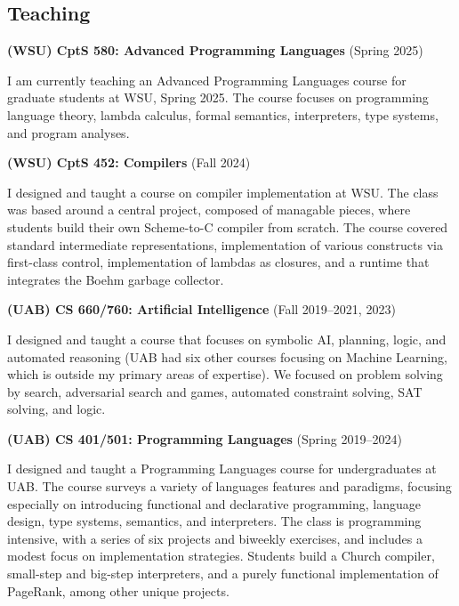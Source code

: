 \documentclass[line]{res}
\begin{document}
\begin{resume}
\section{\large Teaching} \vspace{0.2in}
    
\textbf{(WSU) CptS 580: Advanced Programming Languages} (Spring 2025)

I am currently teaching an Advanced Programming Languages course for graduate students at WSU, Spring 2025. The course focuses on programming language theory, lambda calculus, formal semantics, interpreters, type systems, and program analyses.
    
\textbf{(WSU) CptS 452: Compilers} (Fall 2024)

I designed and taught a course on compiler implementation at WSU. The class was based around a central project, composed of managable pieces, where students build their own Scheme-to-C compiler from scratch. The course covered standard intermediate representations, implementation of various constructs via first-class control, implementation of lambdas as closures, and a runtime that integrates the Boehm garbage collector. 

\newpage
\textbf{(UAB) CS 660/760: Artificial Intelligence} (Fall 2019--2021, 2023)

I designed and taught a course that focuses on symbolic AI, planning, logic, and automated reasoning (UAB had six other courses focusing on Machine Learning, which is outside my primary areas of expertise). We focused on problem solving by search, adversarial search and games, automated constraint solving, SAT solving, and logic. %

\textbf{(UAB) CS 401/501: Programming Languages} (Spring 2019--2024)

I designed and taught a Programming Languages course for undergraduates at UAB. The course surveys a variety of languages features and paradigms, focusing especially on introducing functional and declarative programming, language design, type systems, semantics, and interpreters. The class is programming intensive, with a series of six projects and biweekly exercises, and includes a modest focus on implementation strategies. Students build a Church compiler, small-step and big-step interpreters, and a purely functional implementation of PageRank, among other unique projects.


\end{resume}
\end{document}
